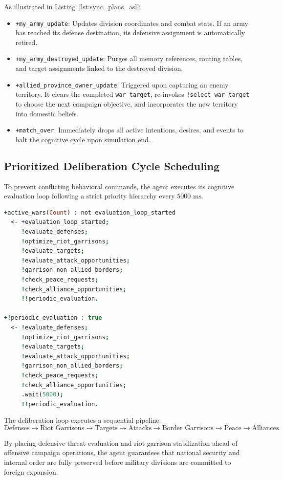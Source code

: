 As illustrated in Listing~\ref{lst:sync_plans_asl}:
\begin{itemize}
    \item \texttt{+my\_army\_update}: Updates division coordinates and combat stats. If an army has reached its defense destination, its defensive assignment is automatically retired.
    \item \texttt{+my\_army\_destroyed\_update}: Purges all memory references, routing tables, and target assignments linked to the destroyed division.
    \item \texttt{+allied\_province\_owner\_update}: Triggered upon capturing an enemy territory. It clears the completed \texttt{war\_target}, re-invokes \texttt{!select\_war\_target} to choose the next campaign objective, and incorporates the new territory into domestic beliefs.
    \item \texttt{+match\_over}: Immediately drops all active intentions, desires, and events to halt the cognitive cycle upon simulation end.
\end{itemize}

\subsection{Prioritized Deliberation Cycle Scheduling}
\label{subsec:deliberation_scheduling}

To prevent conflicting behavioral commands, the agent executes its cognitive evaluation loop following a strict priority hierarchy every $5000\text{ ms}$.

\begin{lstlisting}[language=prolog, caption={Prioritized periodic evaluation loop in \texttt{vesna.asl}.}, label={lst:evaluation_loop_asl}]
+active_wars(Count) : not evaluation_loop_started
  <- +evaluation_loop_started;
     !evaluate_defenses;
     !optimize_riot_garrisons;
     !evaluate_targets;
     !evaluate_attack_opportunities;
     !garrison_non_allied_borders;
     !check_peace_requests;
     !check_alliance_opportunities;
     !!periodic_evaluation.

+!periodic_evaluation : true
  <- !evaluate_defenses;
     !optimize_riot_garrisons;
     !evaluate_targets;
     !evaluate_attack_opportunities;
     !garrison_non_allied_borders;
     !check_peace_requests;
     !check_alliance_opportunities;
     .wait(5000);
     !!periodic_evaluation.
\end{lstlisting}

The deliberation loop executes a sequential pipeline:
\begin{equation}
    \label{eq:deliberation_pipeline}
    \text{Defenses} \longrightarrow \text{Riot Garrisons} \longrightarrow \text{Targets} \longrightarrow \text{Attacks} \longrightarrow \text{Border Garrisons} \longrightarrow \text{Peace} \longrightarrow \text{Alliances}
\end{equation}

By placing defensive threat evaluation and riot garrison stabilization ahead of offensive campaign operations, the agent guarantees that national security and internal order are fully preserved before military divisions are committed to foreign expansion.

